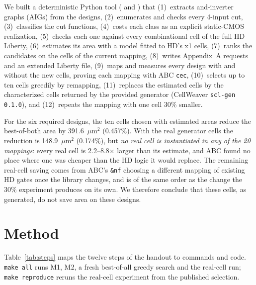 \documentclass[10pt,a4paper]{article}
\newcommand{\um}{\ensuremath{\mu\mathrm{m}^2}}
\newcommand{\file}[1]{\texttt{\detokenize{#1}}}
\begin{document}
We built a deterministic Python tool (\file{src/dd2} and \file{src/dd2m2}) that
(1)~extracts and-inverter graphs (AIGs) from the designs, (2)~enumerates and checks every
4-input cut, (3)~classifies the cut functions, (4)~costs each class as an explicit static-CMOS
realization, (5)~checks each one against every combinational cell of the full HD Liberty,
(6)~estimates its area with a model fitted to HD's x1 cells, (7)~ranks the candidates on the
cells of the current mapping, (8)~writes Appendix~A requests and an extended Liberty file,
(9)~maps and measures every design with and without the new cells, proving each mapping with
ABC \texttt{cec}, (10)~selects up to ten cells greedily by remapping, (11)~replaces the
estimated cells by the characterized cells returned by the provided generator
(CellWeaver \texttt{scl-gen 0.1.0}), and (12)~repeats the mapping with one cell 30\% smaller.

For the six required designs, the ten cells chosen with estimated
areas reduce the best-of-both area by 391.6~\um{} (0.457\%). With the real generator cells the
reduction is 148.9~\um{} (0.174\%), but \emph{no real cell is instantiated in any of the 20
mappings}: every real cell is 2.2--8.8$\times$ larger than its estimate, and ABC found no place
where one was cheaper than the HD logic it would replace. The remaining real-cell saving comes from ABC's \texttt{\&nf} choosing a
different mapping of existing HD gates once the library changes, and is of the same order as the
change the 30\% experiment produces on its own. We therefore conclude that
these cells, as generated, do not save area on these designs.

\section{Method}
\label{sec:method}

Table~\ref{tab:steps} maps the twelve steps of the handout to commands and code.
\texttt{make all} runs M1, M2, a fresh best-of-all greedy search and the real-cell run;
\texttt{make reproduce} reruns the real-cell experiment from the published selection.
\end{document}
